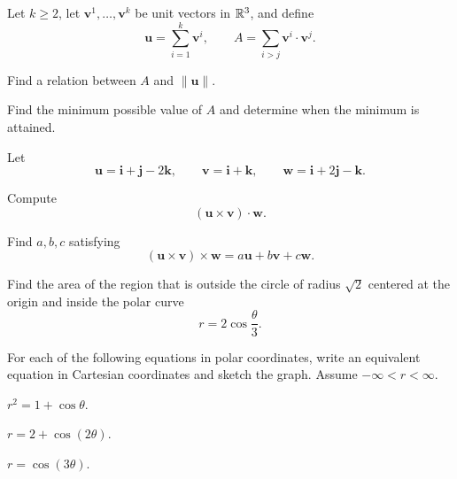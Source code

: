 \begin{problem}
Let $k\ge2$, let $\mathbf v^1,\ldots,\mathbf v^k$ be unit vectors in $\mathbb{R}^3$, and define
\[
\mathbf u=\sum_{i=1}^{k}\mathbf v^i,
\qquad
A=\sum_{i>j}\mathbf v^i\cdot\mathbf v^j.
\]
\begin{problemsubparts}
\item Find a relation between $A$ and $\|\mathbf u\|$.
\item Find the minimum possible value of $A$ and determine when the minimum is attained.
\end{problemsubparts}
\end{problem}
\begin{problem}
Let
\[
\mathbf u=\mathbf i+\mathbf j-2\mathbf k,
\qquad
\mathbf v=\mathbf i+\mathbf k,
\qquad
\mathbf w=\mathbf i+2\mathbf j-\mathbf k.
\]
\begin{problemsubparts}
\item Compute
\[
(\mathbf u\times\mathbf v)\cdot\mathbf w.
\]
\item Find $a,b,c$ satisfying
\[
(\mathbf u\times\mathbf v)\times\mathbf w
=a\mathbf u+b\mathbf v+c\mathbf w.
\]
\end{problemsubparts}
\end{problem}
\begin{problem}
Find the area of the region that is outside the circle of radius $\sqrt2$ centered at the origin and inside the polar curve
\[
r=2\cos\frac{\theta}{3}.
\]
\end{problem}
\begin{problem}
For each of the following equations in polar coordinates, write an equivalent equation in Cartesian coordinates and sketch the graph. Assume $-\infty<r<\infty$.
\begin{problemsubparts}
\item $r^2=1+\cos\theta$.
\item $r=2+\cos(2\theta)$.
\item $r=\cos(3\theta)$.
\end{problemsubparts}
\end{problem}

